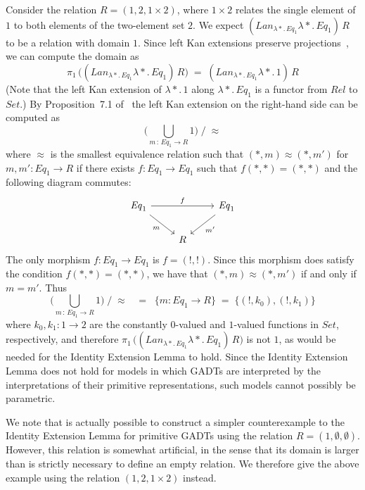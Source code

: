 \documentclass[acmsmall,screen,review,anonymous]{acmart}
\theoremstyle{definition}
\begin{document}
\begin{example}
Consider the relation $R = (1, 2, 1 \times 2)$, where $1 \times 2$
relates the single element of $1$ to both elements of the two-element
set $2$. We expect $(\mathit{Lan}_{\lambda *\!.\,\mathit{Eq}_1}
\lambda *\!.\,\mathit{Eq}_1)\, R$ to be a relation with domain
$1$. Since left Kan extensions preserve projections~\cite{rie16}, we
can compute the domain as
\[\pi_1\,\big( (\mathit{Lan}_{\lambda *\!.\,\mathit{Eq}_1} \lambda
*\!.\,\mathit{Eq}_1) \, R \big)\;=\; (\mathit{Lan}_{\lambda
 *\!.\,\mathit{Eq}_1} \lambda *\!. \,1)\, R\] (Note that the left Kan
 extension of $\lambda *\!. \,1$ along $\lambda *\!.\,\mathit{Eq}_1$
 is a functor from $\mathit{Rel}$ to $\mathit{Set}$.) By
 Proposition~7.1 of~\cite{blw03} the left Kan extension on the
 right-hand side can be computed as
\[ \big( \bigcup_{m\, :\, \mathit{Eq}_1 \to R} 1 \big) \; /\; \approx\]
where $\approx$ is the smallest equivalence relation such that $(\ast,
m) \approx (\ast, m')$ for $m, m' : \mathit{Eq}_1 \to R$ if there
exists $f : \mathit{Eq}_1 \to \mathit{Eq}_1$ such that $f (\ast, \ast)
= (\ast, \ast)$ and the following diagram commutes:
\[
\begin{tikzcd}
\mathit{Eq}_1 \ar[rr, "{f}"] \ar[dr, "m"']
&&\mathit{Eq}_1 \ar[dl, "m'"] \\
&R
\end{tikzcd}
\]
The only morphism $f : \mathit{Eq}_1 \to \mathit{Eq}_1$ is $f = (!,
!)$. Since this morphism does satisfy the condition $f (\ast, \ast) =
(\ast, \ast)$, we have that $(\ast, m) \approx (\ast, m')$ if and only
if $m = m'$. Thus
\[ \big( \bigcup_{m\, :\,
  \mathit{Eq}_1 \to R} 1 \big) \; /\; \approx \;\;\; = \;\; \{m :
\mathit{Eq}_1 \to R\} \;=\; \{(!, k_0), (!, k_1)\}\] where $k_0, k_1 :
1 \to 2$ are the constantly $0$-valued and $1$-valued functions in
$\mathit{Set}$, respectively, and therefore $\pi_1\,\big(
(\mathit{Lan}_{\lambda *\!.\,\mathit{Eq}_1} \lambda
*\!.\,\mathit{Eq}_1) \, R \big)$ is not $1$, as would be needed for
the Identity Extension Lemma to hold.  Since the Identity Extension
Lemma does not hold for models in which GADTs are interpreted by the
interpretations of their primitive representations, such models cannot
possibly be parametric.
\end{example}

\vspace*{-0.05in}

We note that is actually possible to construct a simpler
counterexample to the Identity Extension Lemma for primitive GADTs
using the relation $R = (1,\emptyset, \emptyset)$. However, this
relation is somewhat artificial, in the sense that its domain is
larger than is strictly necessary to define an empty relation. We
therefore give the above example using the relation $(1,2,1 \times 2)$
instead.
\end{document}
